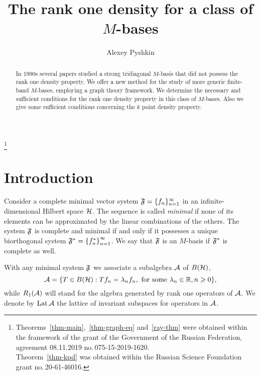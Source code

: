 \documentclass[12pt,oneside,a4paper]{amsart}
\begin{document}
\title{The rank one density for a class of $M$-bases}
\author{Alexey Pyshkin}
\address{Chebyshev Laboratory, Saint Petersburg State University, 14th Line V.O. 29, Saint Petersburg 199178, Russia}
\address{Saint Petersburg Department of RAS, Steklov Math. Institute, Fontanka 27, Saint Petersburg 191023, Russia}
\address{Euler International Mathematical Institute, nab.\,Pesochnaya 10, Saint Petersburg 197022, Russia}


\begin{abstract}
  In 1990s several papers studied a strong tridiagonal $M$-basis
    that did not possess the rank one density property.
  We offer a new method for the study of more generic finite-band $M$-bases,
    employing a graph theory framework.
  We determine the necessary and sufficient conditions for the rank one density property
    in this class of $M$-bases.
  Also we give some sufficient conditions concerning the $k$ point density property.
\end{abstract}
\thanks{Theorems~\ref{thm-main},~\ref{thm-graph-eq} and~\ref{ray-thm} were obtained within the framework of
          the grant of the Government of the Russian Federation, agreement 08.11.2019 no.\,075-15-2019-1620.\\
        Theorem~\ref{thm-kpd} was obtained within the Russian Science Foundation grant no.\,20-61-46016.
        }
\maketitle
\section{Introduction}
  Consider a complete minimal vector system $\fsys = \seq{f}$ in an infinite-dimensional Hilbert space $\cal{H}$.
  The sequence is called \emph{minimal} if none of its elements can be approximated by the linear combinations of the others.
  The system $\fsys$ is complete and minimal if and only if it possesses a unique biorthogonal system $\fstarsys=\left\{f_n^*\right\}_{n=1}^\infty$.
  We say that $\fsys$ is an $M$-basis if $\fstarsys$ is complete as well.

  With any minimal system $\fsys$ we associate a subalgebra $\cal{A}$ of $B(\cal{H})$,
  \[
    \cal{A} = \{T\in B(\cal{H}): Tf_n = \lambda_n f_n, \text{ for some } \lambda_n \in \mathbb{R}, n \geq 0\},
  \]
    while $R_1(\cal{A})$ will stand for the algebra generated by rank one operators of $\cal{A}$.
  We denote by $\lattice$ the lattice of invariant subspaces for operators in $\cal{A}$.
  
\end{document}
